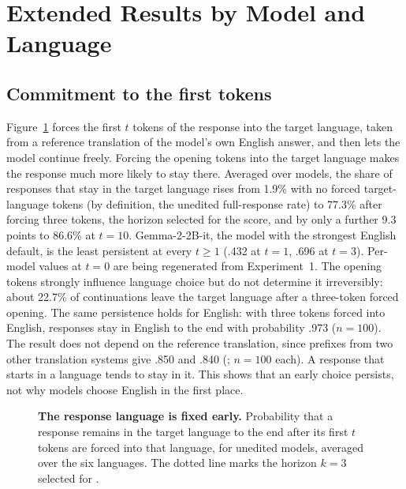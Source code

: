 \section{Extended Results by Model and Language}
\label{app:extended}

\subsection{Commitment to the first tokens}
\label{app:commitment}

Figure~\ref{fig:commitment} forces the first $t$ tokens of the response into the target language, taken from a reference translation of the model's own English answer, and then lets the model continue freely. Forcing the opening tokens into the target language makes the response much more likely to stay there. Averaged over models, the share of responses that stay in the target language rises from 1.9\% with no forced target-language tokens (by definition, the unedited full-response rate) to 77.3\% after forcing three tokens, the horizon selected for the score, and by only a further 9.3 points to 86.6\% at $t{=}10$. Gemma-2-2B-it, the model with the strongest English default, is the least persistent at every $t\ge1$ (.432 at $t{=}1$, .696 at $t{=}3$). Per-model values at $t{=}0$ are being regenerated from Experiment~1. The opening tokens strongly influence language choice but do not determine it irreversibly: about 22.7\% of continuations leave the target language after a three-token forced opening. The same persistence holds for English: with three tokens forced into English, responses stay in English to the end with probability .973 ($n{=}100$). The result does not depend on the reference translation, since prefixes from two other translation systems give .850 and .840 (; $n{=}100$ each). A response that starts in a language tends to stay in it. This shows that an early choice persists, not why models choose English in the first place.

\begin{figure}[!htbp]
  \centering
  \caption{\textbf{The response language is fixed early.} Probability that a response remains in the target language to the end after its first $t$ tokens are forced into that language, for unedited models, averaged over the six languages. The dotted line marks the horizon $k{=}3$ selected for \dM.}
  \label{fig:commitment}
\end{figure}

